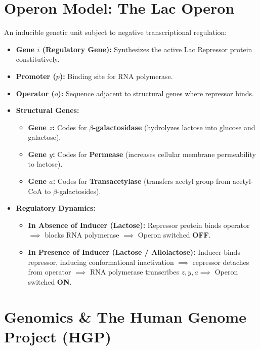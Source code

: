 \documentclass[10pt,twoside,openright]{book}
\begin{document}
\section{Operon Model: The Lac Operon}

\begin{conceptbox}
An inducible genetic unit subject to negative transcriptional regulation:
\begin{itemize}[leftmargin=*]
  \item \textbf{Gene $i$ (Regulatory Gene):} Synthesizes the active Lac Repressor protein constitutively.
  \item \textbf{Promoter ($p$):} Binding site for RNA polymerase.
  \item \textbf{Operator ($o$):} Sequence adjacent to structural genes where repressor binds.
  \item \textbf{Structural Genes:}
  \begin{itemize}
    \item \textbf{Gene $z$:} Codes for \textbf{$\beta$-galactosidase} (hydrolyzes lactose into glucose and galactose).
    \item \textbf{Gene $y$:} Codes for \textbf{Permease} (increases cellular membrane permeability to lactose).
    \item \textbf{Gene $a$:} Codes for \textbf{Transacetylase} (transfers acetyl group from acetyl-CoA to $\beta$-galactosides).
  \end{itemize}
  \item \textbf{Regulatory Dynamics:}
  \begin{itemize}
    \item \textbf{In Absence of Inducer (Lactose):} Repressor protein binds operator $\implies$ blocks RNA polymerase $\implies$ Operon switched \textbf{OFF}.
    \item \textbf{In Presence of Inducer (Lactose / Allolactose):} Inducer binds repressor, inducing conformational inactivation $\implies$ repressor detaches from operator $\implies$ RNA polymerase transcribes $z, y, a \implies$ Operon switched \textbf{ON}.
  \end{itemize}
\end{itemize}
\end{conceptbox}

\section{Genomics \& The Human Genome Project (HGP)}
\end{document}
